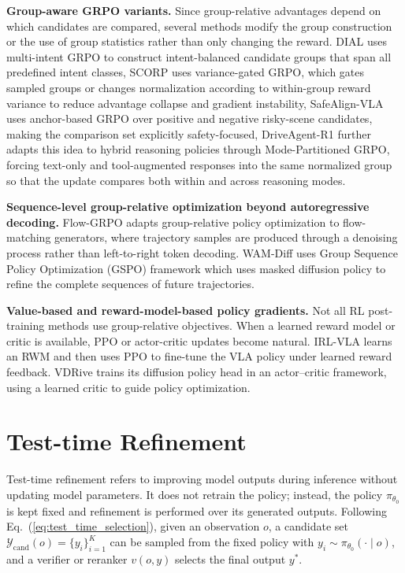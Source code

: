 \documentclass[runningheads]{llncs}
\begin{document}
\textbf{Group-aware GRPO variants.}
Since group-relative advantages depend on which candidates are compared, several methods modify the group construction or the use of group statistics rather than only changing the reward. DIAL \cite{dial2026} uses multi-intent GRPO to construct intent-balanced candidate groups that span all predefined intent classes, SCORP \cite{scorp2026}
uses variance-gated GRPO, which gates sampled groups or changes
normalization according to within-group reward variance to reduce advantage
collapse and gradient instability, SafeAlign-VLA \cite{safealignvla2026} uses anchor-based GRPO over positive and negative risky-scene candidates, making the comparison set explicitly safety-focused,
DriveAgent-R1 \cite{zheng2025driveagent} further adapts this idea to hybrid reasoning policies through
Mode-Partitioned GRPO, forcing text-only and tool-augmented responses into the
same normalized group so that the update compares both within and across
reasoning modes.

\textbf{Sequence-level group-relative optimization beyond autoregressive decoding.}
Flow-GRPO \cite{liu2026flow} adapts group-relative policy optimization to flow-matching generators, where trajectory samples are produced through a denoising process rather than left-to-right token decoding. WAM-Diff \cite{xu2025wam} uses Group Sequence Policy Optimization (GSPO) framework which uses masked diffusion policy to refine the complete sequences of future trajectories.
 

\textbf{Value-based and reward-model-based policy gradients.}
Not all RL post-training methods use group-relative objectives. When a learned reward model or critic is available, PPO or actor-critic updates become natural.
IRL-VLA \cite{jiang2025irl} learns an RWM and then uses PPO to fine-tune the VLA policy under learned reward feedback. VDRive \cite{vdrive2025} trains its diffusion policy head in an actor--critic framework, using a learned critic to guide policy optimization.


\section{Test-time Refinement}
\label{sec:testtime}

Test-time refinement refers to improving model outputs during inference without updating model parameters. It does not retrain the policy; instead, 
the policy $\pi_{\theta_0}$ is kept fixed and refinement is performed over its generated outputs. Following Eq.~(\ref{eq:test_time_selection}), given an observation $o$, a candidate set $\mathcal{Y}_{\mathrm{cand}}(o)=\{y_i\}_{i=1}^{K}$ can be sampled from the fixed policy with $y_i\sim\pi_{\theta_0}(\cdot\mid o)$, and a verifier or reranker $v(o,y)$ selects the final output $y^*$. 
\end{document}
